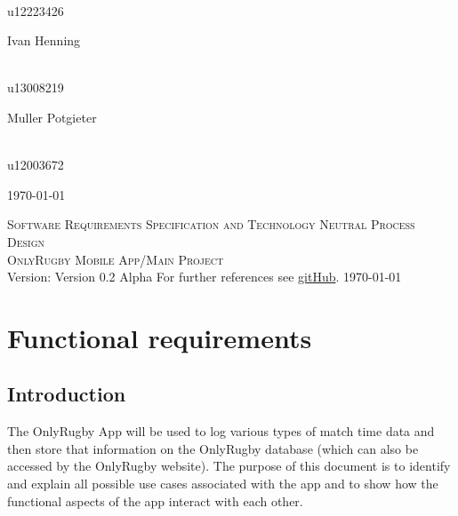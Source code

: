 \documentclass[a4paper,12pt]{report}
\begin{document}
\begin{titlepage}
\begin{center}
\begin{minipage}{0.4\textwidth}
\end{minipage}
\begin{minipage}{0.4\textwidth}
\begin{flushright} \large
\emph{} \\
u12223426
\end{flushright}
\end{minipage}
\begin{minipage}{0.4\textwidth}
\begin{flushleft} \large
Ivan {Henning}
\end{flushleft}
\end{minipage}
\begin{minipage}{0.4\textwidth}
\begin{flushright} \large
\emph{} \\
u13008219
\end{flushright}
\end{minipage}
\begin{minipage}{0.4\textwidth}
\begin{flushleft} \large
Muller {Potgieter}
\end{flushleft}
\end{minipage}
\begin{minipage}{0.4\textwidth}
\begin{flushright} \large
\emph{} \\
u12003672
\end{flushright}
\end{minipage}
\vfill
{\large \today}
\end{center}
\end{titlepage}
\footnotesize
%
\normalsize

\renewcommand{\thesection}{\arabic{section}}
\newpage
\begin{center}
\textsc{\LARGE Software Requirements Specification and Technology Neutral Process Design}\\[1.5cm]
\textsc{\Large OnlyRugby Mobile App/Main Project}\\[0.5cm]
Version: Version 0.2 Alpha 
For further references see \href{ https://github.com/hermankeuris/OnlyRugbyApp.git}{gitHub}.
\today
\end{center}
\tableofcontents{}
\newpage
\section{Functional requirements}
\subsection{Introduction}
The OnlyRugby App will be used to log various types of match time data and then store that information on the OnlyRugby database (which can also be accessed by the OnlyRugby website). The purpose of this document is to identify and explain all possible use cases associated with the app and to show how the functional aspects of the app interact with each other.
\end{document}
